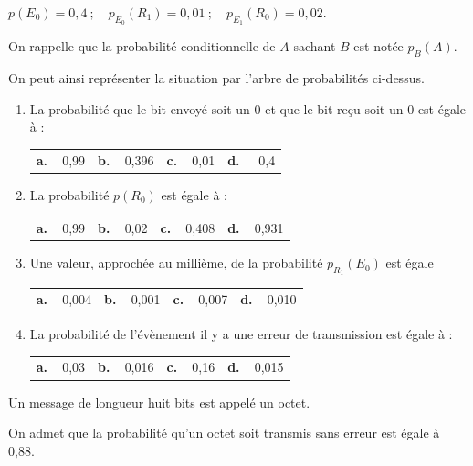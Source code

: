 $p\left(E_0\right) = 0,4 \:;\quad p_{E_0}\left(R_1\right) = 0,01 \:;\quad p_{E_1}\left(R_0\right) = 0,02$.

On rappelle que la probabilité conditionnelle de $A$ sachant $B$ est notée $p_B(A)$.

On peut ainsi représenter la situation par l'arbre de probabilités ci-dessus.

\medskip

\begin{enumerate}
\item La probabilité que le bit envoyé soit un $0$ et que le bit reçu soit un $0$ est égale à :

\begin{center}
\begin{tabularx}{\linewidth}{*{4}{X}}
\textbf{a.~~}0,99 &\textbf{b.~~}0,396 &\textbf{c.~~}0,01 &\textbf{d.~~} 0,4
\end{tabularx}
\end{center}

\item La probabilité  $p\left(R_0\right)$ est égale à :
\begin{center}
\begin{tabularx}{\linewidth}{*{4}{X}}
\textbf{a.~~}0,99 &\textbf{b.~~}0,02 &\textbf{c.~~}0,408 &\textbf{d.~~}0,931
\end{tabularx}
\end{center}
\item Une valeur, approchée au millième, de la probabilité $p_{R_1}\left(E_0\right)$ est égale 
\begin{center}
\begin{tabularx}{\linewidth}{*{4}{X}}
\textbf{a.~~}0,004 &\textbf{b.~~}0,001 &\textbf{c.~~}0,007 &\textbf{d.~~}0,010
\end{tabularx}
\end{center}
\item La probabilité de l'évènement \og  il y a une erreur de transmission \fg{} est égale à :
\begin{center}
\begin{tabularx}{\linewidth}{*{4}{X}}
\textbf{a.~~}0,03 &\textbf{b.~~}0,016 &\textbf{c.~~}0,16 &\textbf{d.~~}0,015
\end{tabularx}
\end{center}
\end{enumerate}

Un message de longueur huit bits est appelé un octet.

On admet que la probabilité qu'un octet soit transmis sans erreur est égale à 0,88.

